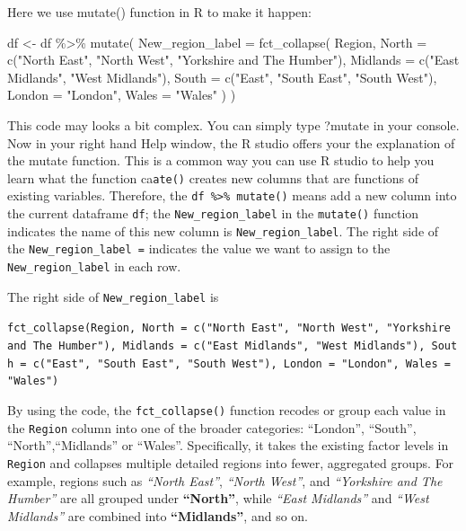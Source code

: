 \documentclass[
  letterpaper,
  DIV=11,
  numbers=noendperiod]{scrreprt}
\newenvironment{Shaded}{\begin{snugshade}}{\end{snugshade}}
\newcommand{\AttributeTok}[1]{\textcolor[rgb]{0.40,0.45,0.13}{#1}}
\newcommand{\FunctionTok}[1]{\textcolor[rgb]{0.28,0.35,0.67}{#1}}
\newcommand{\NormalTok}[1]{\textcolor[rgb]{0.00,0.23,0.31}{#1}}
\newcommand{\OtherTok}[1]{\textcolor[rgb]{0.00,0.23,0.31}{#1}}
\newcommand{\SpecialCharTok}[1]{\textcolor[rgb]{0.37,0.37,0.37}{#1}}
\newcommand{\StringTok}[1]{\textcolor[rgb]{0.13,0.47,0.30}{#1}}
\begin{document}
Here we use mutate() function in R to make it happen:

\begin{Shaded}
\begin{Highlighting}[]
\NormalTok{df }\OtherTok{\textless{}{-}}\NormalTok{ df }\SpecialCharTok{\%\textgreater{}\%}
  \FunctionTok{mutate}\NormalTok{(}
    \AttributeTok{New\_region\_label =} \FunctionTok{fct\_collapse}\NormalTok{(}
\NormalTok{      Region,}
      \AttributeTok{North =} \FunctionTok{c}\NormalTok{(}\StringTok{"North East"}\NormalTok{, }\StringTok{"North West"}\NormalTok{, }\StringTok{"Yorkshire and The Humber"}\NormalTok{),}
      \AttributeTok{Midlands =} \FunctionTok{c}\NormalTok{(}\StringTok{"East Midlands"}\NormalTok{, }\StringTok{"West Midlands"}\NormalTok{),}
      \AttributeTok{South =} \FunctionTok{c}\NormalTok{(}\StringTok{"East"}\NormalTok{, }\StringTok{"South East"}\NormalTok{, }\StringTok{"South West"}\NormalTok{),}
      \AttributeTok{London =} \StringTok{"London"}\NormalTok{,}
      \AttributeTok{Wales =} \StringTok{"Wales"}
\NormalTok{    )}
\NormalTok{  )}
\end{Highlighting}
\end{Shaded}

This code may looks a bit complex. You can simply type ?mutate in your
console. Now in your right hand Help window, the R studio offers your
the explanation of the mutate function. This is a common way you can use
R studio to help you learn what the function ca\texttt{ate()} creates
new columns that are functions of existing variables. Therefore, the
\texttt{df\ \%\textgreater{}\%\ mutate()} means add a new column into
the current dataframe \texttt{df}; the \texttt{New\_region\_label} in
the \texttt{mutate()} function indicates the name of this new column is
\texttt{New\_region\_label}. The right side of the
\texttt{New\_region\_label\ =} indicates the value we want to assign to
the \texttt{New\_region\_label} in each row.

The right side of \texttt{New\_region\_label} is

\texttt{fct\_collapse(Region,\ North\ =\ c("North\ East",\ "North\ West",\ "Yorkshire\ and\ The\ Humber"),\ Midlands\ =\ c("East\ Midlands",\ "West\ Midlands"),\ South\ =\ c("East",\ "South\ East",\ "South\ West"),\ London\ =\ "London",\ Wales\ =\ "Wales")}

By using the code, the \texttt{fct\_collapse()} function recodes or
group each value in the \texttt{Region} column into one of the broader
categories: ``London'', ``South'', ``North'',``Midlands'' or ``Wales''.
Specifically, it takes the existing factor levels in \texttt{Region} and
collapses multiple detailed regions into fewer, aggregated groups. For
example, regions such as \emph{``North East''}, \emph{``North West''},
and \emph{``Yorkshire and The Humber''} are all grouped under
\textbf{``North''}, while \emph{``East Midlands''} and \emph{``West
Midlands''} are combined into \textbf{``Midlands''}, and so on.
\end{document}
